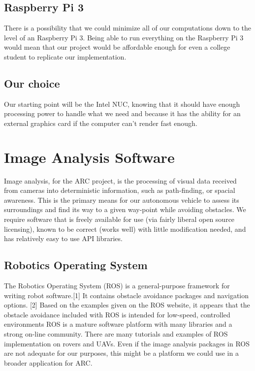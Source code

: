 \documentclass[compsoc,draftclsnofoot,onecolumn,10pt]{IEEEtran}
\begin{document}
\subsection{Raspberry Pi 3}
There is a possibility that we could minimize all of our computations down to the level of an Raspberry Pi 3. 
Being able to run everything on the Raspberry Pi 3 would mean that our project would be affordable enough for even a college student to replicate our implementation. 

\subsection{Our choice}
Our starting point will be the Intel NUC, knowing that it should have enough processing power to handle what we need and because it has the ability for an external graphics card if the computer can't render fast enough. 


\newpage

\section{Image Analysis Software}
Image analysis, for the ARC project, is the processing of visual data received
from cameras into deterministic information, such as path-finding, or spacial
awareness. This is the primary means for our autonomous vehicle to assess its
surroundings and find its way to a given way-point while avoiding obstacles. We
require software that is freely available for use (via fairly liberal open
source licensing), known to be correct (works well) with little modification
needed, and has relatively easy to use API libraries.

\subsection{Robotics Operating System}
The Robotics Operating System (ROS) is a general-purpose framework for writing
robot software.[1] It contains obstacle avoidance packages and navigation
options. [2] Based on the examples given on the ROS website, it appears that the
obstacle avoidance included with ROS is intended for low-speed, controlled
environments ROS is a mature software platform with many libraries and a strong
on-line community.  There are many tutorials and examples of ROS implementation
on rovers and UAVs.  Even if the image analysis packages in ROS are not adequate
for our purposes, this might be a platform we could use in a broader application
for ARC.
\end{document}
